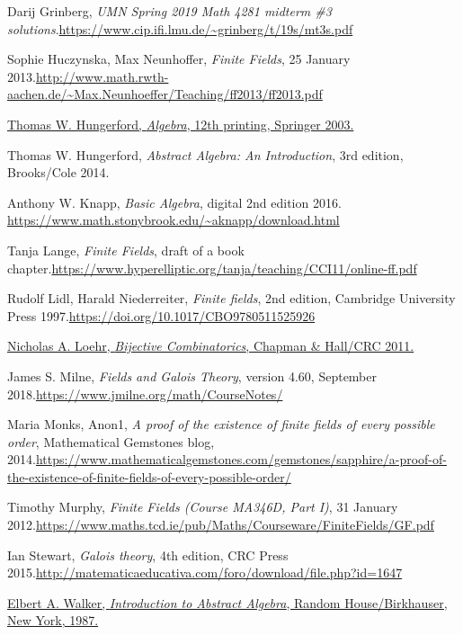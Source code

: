 \documentclass[numbers=enddot,12pt,final,onecolumn,notitlepage]{scrartcl}%
\theoremstyle{definition}
\begin{document}
\begin{thebibliography}{999999999}
Darij Grinberg, \textit{UMN Spring 2019 Math 4281
midterm \#3 solutions}.\newline\url{https://www.cip.ifi.lmu.de/~grinberg/t/19s/mt3s.pdf}

Sophie Huczynska, Max Neunhoffer, \textit{Finite
Fields}, 25 January 2013.\newline\url{http://www.math.rwth-aachen.de/~Max.Neunhoeffer/Teaching/ff2013/ff2013.pdf}

%
\href{http://link.springer.com/book/10.1007/978-1-4612-6101-8}{Thomas W.
Hungerford, \textit{Algebra}, 12th printing, Springer 2003.}

Thomas W. Hungerford, \textit{Abstract Algebra:
An Introduction}, 3rd edition, Brooks/Cole 2014.

Anthony W. Knapp, \textit{Basic Algebra}, digital
2nd edition 2016. \newline\url{https://www.math.stonybrook.edu/~aknapp/download.html}

Tanja Lange, \textit{Finite Fields}, draft of a book
chapter.\newline\url{https://www.hyperelliptic.org/tanja/teaching/CCI11/online-ff.pdf}

Rudolf Lidl, Harald Niederreiter, \textit{Finite
fields}, 2nd edition, Cambridge University Press 1997.\newline\url{https://doi.org/10.1017/CBO9780511525926}

%
\href{https://www.math.vt.edu/people/nloehr/bijbook.html}{Nicholas A. Loehr,
\textit{Bijective Combinatorics}, Chapman \& Hall/CRC 2011.}

James S. Milne, \textit{Fields and Galois Theory},
version 4.60, September 2018.\newline\url{https://www.jmilne.org/math/CourseNotes/}

Maria Monks, Anon1, \textit{A proof of the
existence of finite fields of every possible order}, Mathematical Gemstones
blog, 2014.\newline\url{https://www.mathematicalgemstones.com/gemstones/sapphire/a-proof-of-the-existence-of-finite-fields-of-every-possible-order/}

Timothy Murphy, \textit{Finite Fields (Course
MA346D, Part I)}, 31 January 2012.\newline\url{https://www.maths.tcd.ie/pub/Maths/Courseware/FiniteFields/GF.pdf}

Ian Stewart, \textit{Galois theory}, 4th edition,
CRC Press 2015.\newline\url{http://matematicaeducativa.com/foro/download/file.php?id=1647}

%
\href{https://web.archive.org/web/20170809055317/https://www.math.nmsu.edu/~elbert/AbsAlgeb.pdf}{Elbert
A. Walker, \textit{Introduction to Abstract Algebra}, Random House/Birkhauser,
New York, 1987.}
\end{thebibliography}
\end{document}
